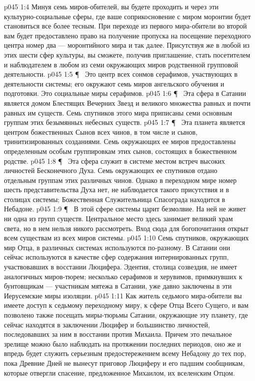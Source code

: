 \vs p045 1:4 Минуя семь миров\hyp{}обителей, вы будете проходить и через эти культурно\hyp{}социальные сферы, где ваше соприкосновение с миром моронтии будет становиться все более тесным. При переходе из первого мира\hyp{}обители во второй вам будет предоставлено право на получение пропуска на посещение переходного центра номер два --- моронтийного мира и так далее. Присутствуя же в любой из этих шести сфер культуры, вы сможете, получив приглашение, стать посетителем и наблюдателем в любом из семи окружающих миров родственной групповой деятельности.
\vs p045 1:5 \P\  Это центр всех сонмов серафимов, участвующих в деятельности системы; его окружают семь миров ангельского обучения и подготовки. Это социальные миры серафимов.
\vs p045 1:6 \P\  Эта сфера в Сатании является домом Блестящих Вечерних Звезд и великого множества равных и почти равных им существ. Семь спутников этого мира приписаны семи основным группам этих безымянных небесных существ.
\vs p045 1:7 \P\  Эта планета является центром божественных Сынов всех чинов, в том числе и сынов, тринитизированных созданиями. Семь окружающих ее миров предоставлены определенным особым группировкам этих сынов, состоящих в божественном родстве.
\vs p045 1:8 \P\  Эта сфера служит в системе местом встреч высоких личностей Бесконечного Духа. Семь окружающих ее спутников отдано отдельным группам этих различных чинов. Однако в переходном мире номер шесть представительства Духа нет, не наблюдается такого присутствия и в столицах системы; Божественная Служительница Спасограда находится  в Небадоне.
\vs p045 1:9 \P\  В этой сфере системы царит безмолвие. На ней не живет ни одна из групп существ. Центральное место здесь занимает великий храм света, но в нем нельзя никого рассмотреть. Вход сюда для богопочитания открыт всем существам из всех миров системы.
\vs p045 1:10 Семь спутников, окружающих мир Отца, в различных системах используются по\hyp{}разному. В Сатании они сейчас используются в качестве сфер содержания интернированных групп, участвовавших в восстании Люцифера. Эдентия, столица созвездия, не имеет аналогичных миров\hyp{}тюрем; несколько серафимов и херувимов, примкнувших к бунтовщикам --- участникам мятежа в Сатании, уже давно заключены в эти Иерусемские миры изоляции.
\vs p045 1:11 Как житель седьмого мира\hyp{}обители вы имеете доступ к седьмому переходному миру, к сфере Отца Всего Сущего, и вам позволено также посещать миры\hyp{}тюрьмы Сатании, окружающие эту планету, где сейчас находятся в заключении Люцифер и большинство личностей, последовавших за ним в восстании против Михаила. Причем это печальное зрелище можно было наблюдать на протяжении последних периодов, оно же и впредь будет служить серьезным предостережением всему Небадону до тех пор, пока Древние Дней не вынесут приговор Люциферу и его падшим сообщникам, которые отвергли спасение, предложенное Михаилом, их вселенским Отцом.
